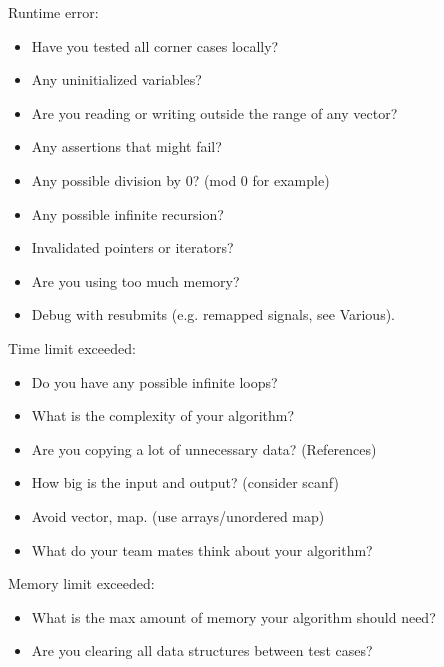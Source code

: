 Runtime error:
\begin{itemize}
\item Have you tested all corner cases locally?
\item Any uninitialized variables?
\item Are you reading or writing outside the range of any vector?
\item Any assertions that might fail?
\item Any possible division by 0? (mod 0 for example)
\item Any possible infinite recursion?
\item Invalidated pointers or iterators?
\item Are you using too much memory?
\item Debug with resubmits (e.g. remapped signals, see Various).
\end{itemize}

Time limit exceeded:
\begin{itemize}
\item Do you have any possible infinite loops?
\item What is the complexity of your algorithm?
\item Are you copying a lot of unnecessary data? (References)
\item How big is the input and output? (consider scanf)
\item Avoid vector, map. (use arrays/unordered map)
\item What do your team mates think about your algorithm?
\end{itemize}

Memory limit exceeded:
\begin{itemize}
\item What is the max amount of memory your algorithm should need?
\item Are you clearing all data structures between test cases?
\end{itemize}